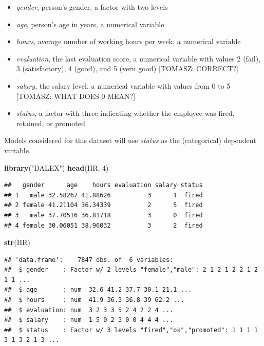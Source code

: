 \documentclass[12pt,]{krantz}
\newenvironment{Shaded}{\begin{snugshade}}{\end{snugshade}}
\newcommand{\DecValTok}[1]{\textcolor[rgb]{0.00,0.00,0.81}{#1}}
\newcommand{\KeywordTok}[1]{\textcolor[rgb]{0.13,0.29,0.53}{\textbf{#1}}}
\newcommand{\NormalTok}[1]{#1}
\newcommand{\StringTok}[1]{\textcolor[rgb]{0.31,0.60,0.02}{#1}}
\providecommand{\tightlist}{%
  \setlength{\itemsep}{0pt}\setlength{\parskip}{0pt}}
\theoremstyle{definition}
\theoremstyle{definition}
\theoremstyle{definition}
\theoremstyle{remark}
\begin{document}
\begin{itemize}
\tightlist
\item
  \emph{gender}, person's gender, a factor with two levels
\item
  \emph{age}, person's age in years, a numerical variable
\item
  \emph{hours}, average number of working hours per week, a numerical
  variable
\item
  \emph{evaluation}, the last evaluation score, a numerical variable
  with values 2 (fail), 3 (satisfactory), 4 (good), and 5 (veru good)
  {[}TOMASZ: CORRECT?{]}
\item
  \emph{salary}, the salary level, a numerical variable with values from
  0 to 5 {[}TOMASZ: WHAT DOES 0 MEAN?{]}
\item
  \emph{status}, a factor with three indicating whether the employee was
  fired, retained, or promoted
\end{itemize}

Models considered for this dataset will use \emph{status} as the
(categorical) dependent variable.

\begin{Shaded}
\begin{Highlighting}[]
\KeywordTok{library}\NormalTok{(}\StringTok{"DALEX"}\NormalTok{)}
\KeywordTok{head}\NormalTok{(HR, }\DecValTok{4}\NormalTok{)}
\end{Highlighting}
\end{Shaded}

\begin{verbatim}
##   gender      age    hours evaluation salary status
## 1   male 32.58267 41.88626          3      1  fired
## 2 female 41.21104 36.34339          2      5  fired
## 3   male 37.70516 36.81718          3      0  fired
## 4 female 30.06051 38.96032          3      2  fired
\end{verbatim}

\begin{Shaded}
\begin{Highlighting}[]
\KeywordTok{str}\NormalTok{(HR)}
\end{Highlighting}
\end{Shaded}

\begin{verbatim}
## 'data.frame':    7847 obs. of  6 variables:
##  $ gender    : Factor w/ 2 levels "female","male": 2 1 2 1 2 2 1 2 1 1 ...
##  $ age       : num  32.6 41.2 37.7 30.1 21.1 ...
##  $ hours     : num  41.9 36.3 36.8 39 62.2 ...
##  $ evaluation: num  3 2 3 3 5 2 4 2 2 4 ...
##  $ salary    : num  1 5 0 2 3 0 0 4 4 4 ...
##  $ status    : Factor w/ 3 levels "fired","ok","promoted": 1 1 1 1 3 1 3 2 1 3 ...
\end{verbatim}
\end{document}
